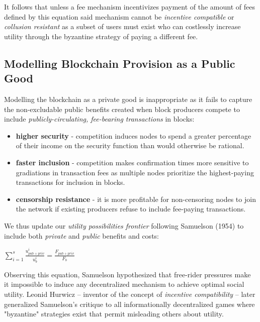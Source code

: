 \documentclass[oneside]{article}   	%
\begin{document}
It follows that unless a fee mechanism incentivizes payment of the amount of fees defined by this equation said mechanism cannot be \textit{incentive compatible} or \textit{collusion resistant} as a subset of users must exist who can costlessly increase utility through the byzantine strategy of paying a different fee.

\subsection*{Modelling Blockchain Provision as a Public Good}

Modelling the blockchain as a private good is inappropriate as it fails to capture the non-excludable public benefits created when block producers compete to include \textit{publicly-circulating, fee-bearing transactions} in blocks:

\begin{itemize}
  \item \textbf{higher security} - competition induces nodes to spend a greater percentage of their income on the security function than would otherwise be rational.
  \item \textbf{faster inclusion} - competition makes confirmation times more sensitive to gradiations in transaction fees as multiple nodes prioritize the highest-paying transactions for inclusion in blocks.
  \item \textbf{censorship resistance} - it is more profitable for non-censoring nodes to join the network if existing producers refuse to include fee-paying transactions.
\end{itemize}

We thus update our \textit{utility possibilities frontier} following Samuelson (1954) to include both \textit{private} and \textit{public} benefits and costs:

\LARGE
\begin{adjustwidth}{1.5em}{1.5em} 
\begin{math}
\sum_{i=1}^{s} \frac{u_{{pub}+{priv}}^i}{u_b^i} = \frac{F_{{pub}+{priv}}}{F_b}
\end{math}
\end{adjustwidth}
\normalsize

Observing this equation, Samuelson hypothesized that free-rider pressures make it impossible to induce any decentralized mechanism to achieve optimal social utility. Leonid Hurwicz -- inventor of the concept of \textit{incentive compatibility} -- later generalized Samuelson's critique to all informationally decentralized games where "byzantine" strategies exist that permit misleading others about utility.
\end{document}
